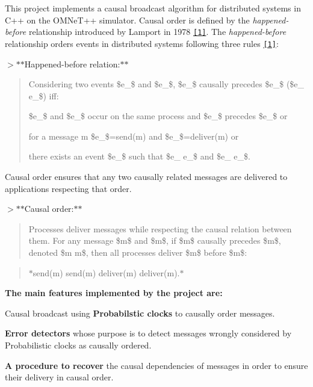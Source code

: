 This project implements a causal broadcast algorithm for distributed systems in C++ on the O\+M\+Ne\+T++ simulator. Causal order is defined by the {\itshape happened-\/before} relationship introduced by Lamport in 1978 \href{https://amturing.acm.org/p558-lamport.pdf}{\tt \mbox{[}1\mbox{]}}. The {\itshape happened-\/before} relationship orders events in distributed systems following three rules \href{https://amturing.acm.org/p558-lamport.pdf}{\tt \mbox{[}1\mbox{]}}\+:

$>$$\ast$$\ast$\+Happened-\/before relation\+:$\ast$$\ast$ \begin{quote}
Considering two events \$e\+\_\$ and \$e\+\_\$, \$e\+\_\$ causally precedes \$e\+\_\$ (\$e\+\_  e\+\_\$) iff\+:
\begin{DoxyEnumerate}
\item \$e\+\_\$ and \$e\+\_\$ occur on the same process and \$e\+\_\$ precedes \$e\+\_\$ or
\item for a message m \$e\+\_\$=send(m) and \$e\+\_\$=deliver(m) or
\item there exists an event \$e\+\_\$ such that \$e\+\_ e\+\_\$ and \$e\+\_ e\+\_\$. 
\end{DoxyEnumerate}\end{quote}


Causal order ensures that any two causally related messages are delivered to applications respecting that order.

$>$$\ast$$\ast$\+Causal order\+:$\ast$$\ast$ \begin{quote}
Processes deliver messages while respecting the causal relation between them. For any message \$m\$ and \$m\textquotesingle{}\$, if \$m\$ causally precedes \$m\textquotesingle{}\$, denoted \$m m\textquotesingle{}\$, then all processes deliver \$m\$ before \$m\textquotesingle{}\$\+: \end{quote}


\begin{quote}
\begin{center}$\ast$send(m)  send(m\textquotesingle{})  deliver(m)  deliver(m\textquotesingle{}).$\ast$ \end{center}  \end{quote}


{\bfseries The main features implemented by the project are\+:}
\begin{DoxyEnumerate}
\item Causal broadcast using {\bfseries Probabilstic clocks} to causally order messages.
\item {\bfseries Error detectors} whose purpose is to detect messages wrongly considered by Probabilistic clocks as causally ordered.
\item {\bfseries A procedure to recover} the causal dependencies of messages in order to ensure their delivery in causal order.
\end{DoxyEnumerate}

